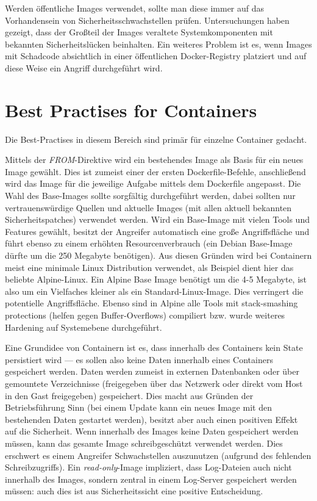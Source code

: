 Werden öffentliche Images verwendet, sollte man diese immer auf das Vorhandensein von Sicherheitsschwachstellen prüfen. Untersuchungen haben gezeigt, dass der Großteil der Images veraltete Systemkomponenten mit bekannten Sicherheitslücken beinhalten. Ein weiteres Problem ist es, wenn Images mit Schadcode absichtlich in einer öffentlichen Docker-Registry platziert und auf diese Weise ein Angriff durchgeführt wird.

\section{Best Practises for Containers}

Die Best-Practises in diesem Bereich sind primär für einzelne Container gedacht.

Mittels der \textit{FROM}-Direktive wird ein bestehendes Image als Basis für ein neues Image gewählt. Dies ist zumeist einer der ersten Dockerfile-Befehle, anschließend wird das Image für die jeweilige Aufgabe mittels dem Dockerfile angepasst. Die Wahl des Base-Images sollte sorgfältig durchgeführt werden, dabei sollten nur vertrauenswürdige Quellen und aktuelle Images (mit allen aktuell bekannten Sicherheitspatches) verwendet werden. Wird ein Base-Image mit vielen Tools und Features gewählt, besitzt der Angreifer automatisch eine große Angriffsfläche und führt ebenso zu einem erhöhten Resourcenverbrauch (ein Debian Base-Image dürfte um die 250 Megabyte benötigen). Aus diesen Gründen wird bei Containern meist eine minimale Linux Distribution verwendet, als Beispiel dient hier das beliebte Alpine-Linux. Ein Alpine Base Image benötigt um die 4-5 Megabyte, ist also um ein Vielfaches kleiner als ein Standard-Linux-Image. Dies verringert die potentielle Angriffsfläche. Ebenso sind in Alpine alle Tools mit stack-smashing protections (helfen gegen Buffer-Overflows) compiliert bzw. wurde weiteres Hardening auf Systemebene durchgeführt.

Eine Grundidee von Containern ist es, dass innerhalb des Containers kein State persistiert wird --- es sollen also keine Daten innerhalb eines Containers gespeichert werden. Daten werden zumeist in externen Datenbanken oder über gemountete Verzeichnisse (freigegeben über das Netzwerk oder direkt vom Host in den Gast freigegeben) gespeichert. Dies macht aus Gründen der Betriebsführung Sinn (bei einem Update kann ein neues Image mit den bestehenden Daten gestartet werden), besitzt aber auch einen positiven Effekt auf die Sicherheit. Wenn innerhalb des Images keine Daten gespeichert werden müssen, kann das gesamte Image schreibgeschützt verwendet werden. Dies erschwert es einem Angreifer Schwachstellen auszunutzen (aufgrund des fehlenden Schreibzugriffs). Ein \textit{read-only}-Image impliziert, dass Log-Dateien auch nicht innerhalb des Images, sondern zentral in einem Log-Server gespeichert werden müssen: auch dies ist aus Sicherheitssicht eine positive Entscheidung.

